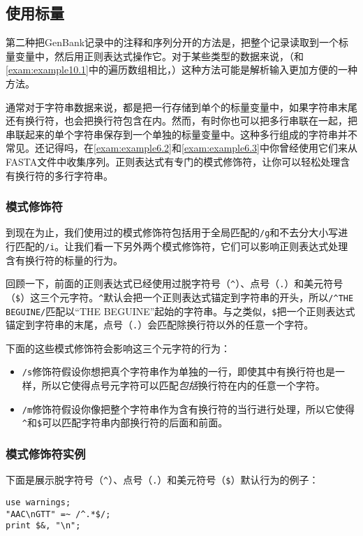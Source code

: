 \subsection{使用标量}
第二种把GenBank记录中的注释和序列分开的方法是，把整个记录读取到一个标量变量中，然后用正则表达式操作它。对于某些类型的数据来说，（和\autoref{exam:example10.1}中的遍历数组相比，）这种方法可能是解析输入更加方便的一种方法。

通常对于字符串数据来说，都是把一行存储到单个的标量变量中，如果字符串末尾还有换行符，也会把换行符包含在内。然而，有时你也可以把多行串联在一起，把串联起来的单个字符串保存到一个单独的标量变量中。这种多行组成的字符串并不常见。还记得吗，在\autoref{exam:example6.2}和\autoref{exam:example6.3}中你曾经使用它们来从FASTA文件中收集序列。正则表达式有专门的模式修饰符，让你可以轻松处理含有换行符的多行字符串。

\subsubsection{模式修饰符}
到现在为止，我们使用过的模式修饰符包括用于全局匹配的\verb|/g|和不去分大小写进行匹配的\verb|/i|。让我们看一下另外两个模式修饰符，它们可以影响正则表达式处理含有换行符的标量的行为。

回顾一下，前面的正则表达式已经使用过脱字符号（\verb|^|）、点号（\verb|.|）和美元符号（\verb|$|）这三个元字符。\verb|^|默认会把一个正则表达式锚定到字符串的开头，所以\verb|/^THE BEGUINE/|匹配以“THE BEGUINE”起始的字符串。与之类似，\verb|$|把一个正则表达式锚定到字符串的末尾，点号（\verb|.|）会匹配除换行符以外的任意一个字符。

下面的这些模式修饰符会影响这三个元字符的行为：

\begin{itemize}
  \item \verb|/s|修饰符假设你想把真个字符串作为单独的一行，即使其中有换行符也是一样，所以它使得点号元字符可以匹配\textit{包括}换行符在内的任意一个字符。
  \item
    \verb|/m|修饰符假设你像把整个字符串作为含有换行符的当行进行处理，所以它使得\verb|^|和\verb|$|可以匹配字符串内部换行符的后面和前面。
\end{itemize}

\subsubsection{模式修饰符实例}
下面是展示脱字符号（\verb|^|）、点号（\verb|.|）和美元符号（\verb|$|）默认行为的例子：

\begin{lstlisting}
use warnings;
"AAC\nGTT" =~ /^.*$/;
print $&, "\n";
\end{lstlisting}


